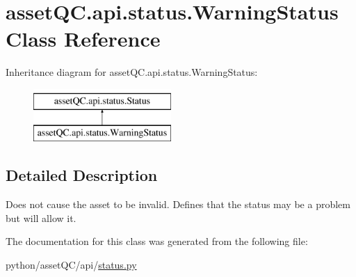 \hypertarget{classassetQC_1_1api_1_1status_1_1WarningStatus}{\section{asset\-Q\-C.\-api.\-status.\-Warning\-Status \-Class \-Reference}
\label{d8/d5a/classassetQC_1_1api_1_1status_1_1WarningStatus}
}
\-Inheritance diagram for asset\-Q\-C.\-api.\-status.\-Warning\-Status\-:\begin{figure}[H]
\begin{center}
\leavevmode
\includegraphics[height=2.000000cm]{d8/d5a/classassetQC_1_1api_1_1status_1_1WarningStatus}
\end{center}
\end{figure}


\subsection{\-Detailed \-Description}
\begin{DoxyVerb}
Does not cause the asset to be invalid.
Defines that the status may be a problem but will allow it.
\end{DoxyVerb}
 

\-The documentation for this class was generated from the following file\-:\begin{DoxyCompactItemize}
\item 
python/asset\-Q\-C/api/\hyperlink{status_8py}{status.\-py}\end{DoxyCompactItemize}
